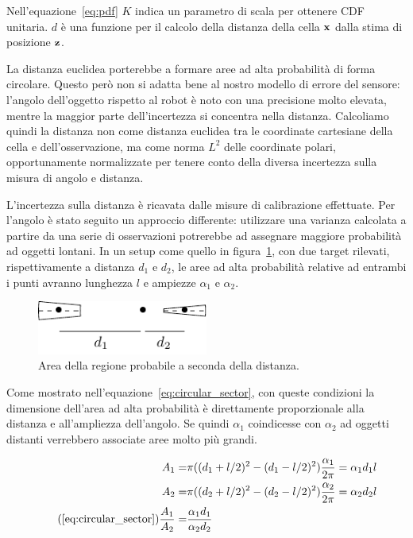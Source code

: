 \documentclass[a4paper]{article}
\begin{document}
	Nell'equazione~\ref{eq:pdf} $K$ indica un parametro di scala per ottenere
	CDF unitaria. $d$ è una funzione per il calcolo della distanza della cella
	$ {\bf x} $ dalla stima di posizione $ {\bf z} $.

	La distanza euclidea porterebbe a formare aree ad alta probabilità di forma
	circolare. Questo però non si adatta bene al nostro modello di errore del
	sensore: l'angolo dell'oggetto rispetto al robot è noto con una precisione
	molto elevata, mentre la maggior parte dell'incertezza si concentra nella
	distanza. Calcoliamo quindi la distanza non come distanza euclidea tra le
	coordinate cartesiane della cella e dell'osservazione, ma come norma $ L^2
	$ delle coordinate polari, opportunamente normalizzate per tenere conto
	della diversa incertezza sulla misura di angolo e distanza.

	L'incertezza sulla distanza è ricavata dalle misure di calibrazione
	effettuate. Per l'angolo è stato seguito un approccio differente:
	utilizzare una varianza calcolata a partire da una serie di osservazioni
	potrerebbe ad assegnare maggiore probabilità ad oggetti lontani.  In un
	setup come quello in figura~\ref{fig:circular_sector}, con due target
	rilevati, rispettivamente a distanza $d_1$ e $d_2$, le aree ad alta
	probabilità relative ad entrambi i punti avranno lunghezza $l$ e ampiezze $
	\alpha_1 \text{ e } \alpha_2  $. 
	
	\begin{figure}[H]
		\centering
		\includegraphics[width=0.5\textwidth]{img/circular_sector.pdf}
		\caption{Area della regione probabile a seconda della distanza.}
		\label{fig:circular_sector}
	\end{figure}

	Come mostrato nell'equazione~\ref{eq:circular_sector}, con queste
	condizioni la dimensione dell'area ad alta probabilità è direttamente
	proporzionale alla distanza e all'ampliezza dell'angolo. Se quindi $
	\alpha_1 $ coindicesse con $ \alpha _2 $ ad oggetti distanti verrebbero
	associate aree molto più grandi. 

	\begin{subequations}\label{eq:circular_sector}
	\begin{align*} 
		A_1  = & \pi((d_1+l/2)^2-(d_1-l/2)^2)\frac{\alpha_1}{2\pi}  =  \alpha_1 d_1l \\
		A_2  = & \pi((d_2+l/2)^2-(d_2-l/2)^2)\frac{\alpha_2}{2\pi}  =  \alpha_2 d_2l \\
\tag{\ref{eq:circular_sector}}
		\frac{A_1}{A_2} = & \frac	{\alpha_1 d_1} {\alpha_2 d_2}
	\end{align*}
	\end{subequations}
	
\end{document}
